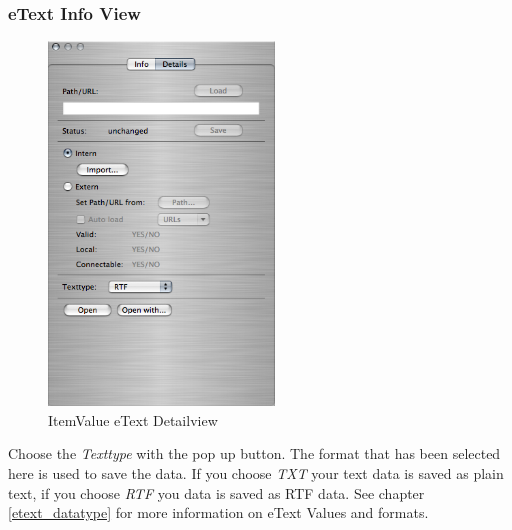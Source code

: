 \documentclass[12pt,a4]{article}
\begin{document}
\subsubsection{eText Info View}
\label{gui_etext_info}
\medskip
% 
\begin{figure}[ht]
\begin{center}
\includegraphics[width=6.0cm]{images/ItemValue_EText_DetailView.png}
\end{center}
\caption{ItemValue eText Detailview}
\label{image:itemvalueetextdetail}
\end{figure}
\noindent
%
Choose the \textit{Texttype} with the pop up button. The format that has been selected here is used to save the data. If you choose \textit{TXT} your text data is saved as plain text, if you choose \textit{RTF} you data is saved as RTF data. See chapter \ref{etext_datatype} for more information on eText Values and formats.
\end{document}
